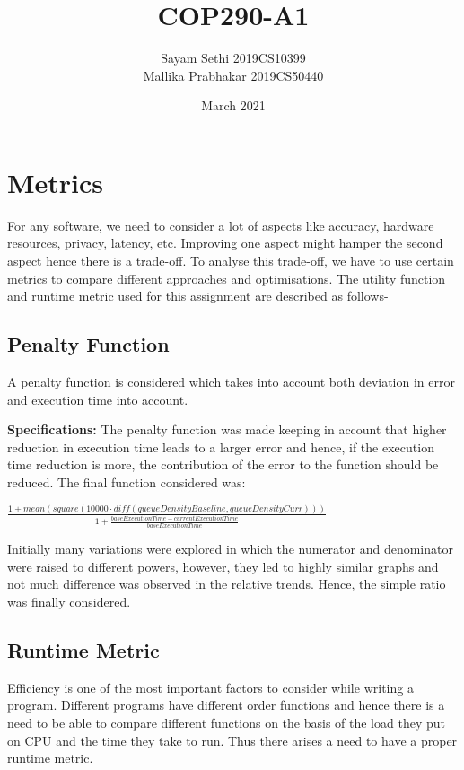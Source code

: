 \documentclass{article}
\title{COP290-A1}
\author{Sayam Sethi 2019CS10399 \\ Mallika Prabhakar 2019CS50440 }
\date{March 2021}
\newcommand\ddfrac[2]{{\displaystyle\frac{\displaystyle #1}{\displaystyle #2}}}
\begin{document}
\maketitle

\section{Metrics}
For any software, we need to consider a lot of aspects like accuracy, hardware resources, privacy, latency, etc. Improving one aspect might hamper the second aspect hence there is a trade-off. To analyse this trade-off, we have to use certain metrics to compare different approaches and optimisations. The utility function and runtime metric used for this assignment are described as follows-

\subsection{Penalty Function}
A penalty function is considered which takes into account both deviation in error and execution time into account.

\textbf{Specifications:} The penalty function was made keeping in account that higher reduction in execution time leads to a larger error and hence, if the execution time reduction is more, the contribution of the error to the function should be reduced. The final function considered was:
\begin{center}
    $\ddfrac{1 + \mathit{mean}(\mathit{square}(10000\cdot\mathit{diff}(\mathit{queueDensityBaseline}, \mathit{queueDensityCurr})))}{1 + \frac{\mathit{baseExecutionTime} - \mathit{currentExecutionTime}}{\mathit{baseExecutionTime}}}$
\end{center}
Initially many variations were explored in which the numerator and denominator were raised to different powers, however, they led to highly similar graphs and not much difference was observed in the relative trends. Hence, the simple ratio was finally considered.

\subsection{Runtime Metric}
Efficiency is one of the most important factors to consider while writing a program. Different programs have different order functions and hence there is a need to be able to compare different functions on the basis of the load they put on CPU and the time they take to run. Thus there arises a need to have a proper runtime metric.
\end{document}

